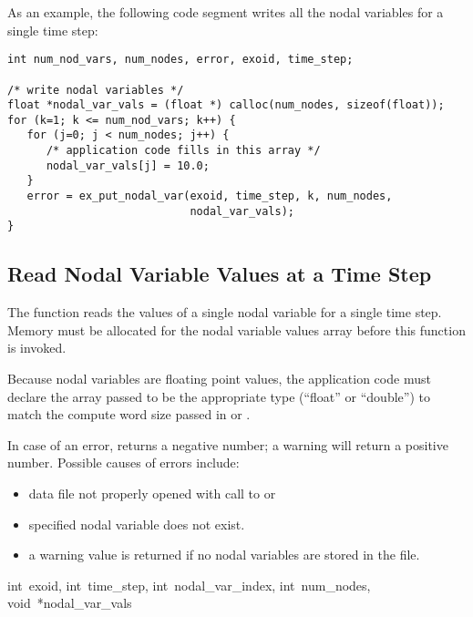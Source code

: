 As an example, the following code segment writes all the nodal
variables for a single time step:

\begin{lstlisting}
int num_nod_vars, num_nodes, error, exoid, time_step;

/* write nodal variables */
float *nodal_var_vals = (float *) calloc(num_nodes, sizeof(float));
for (k=1; k <= num_nod_vars; k++) {
   for (j=0; j < num_nodes; j++) {
      /* application code fills in this array */
      nodal_var_vals[j] = 10.0;
   }
   error = ex_put_nodal_var(exoid, time_step, k, num_nodes,
                            nodal_var_vals);
}
\end{lstlisting}

\subsection{Read Nodal Variable Values at a Time Step}

The function  reads the values of a single
nodal variable for a single time step. Memory must be allocated for
the nodal variable values array before this function is invoked.


Because nodal variables are floating point values, the application
code must declare the array passed to be the appropriate type
(``float'' or ``double'') to match the compute word size passed in
 or .

In case of an error,  returns a negative
number; a warning will return a positive number. Possible causes of
errors include:
\begin{itemize}
 \item data file not properly opened with call to 
 or 

 \item specified nodal variable does not exist.

 \item a warning value is returned if no nodal variables are stored in
 the file.
\end{itemize}

{int~exoid, 
int~time_step, 
int~nodal_var_index,
int~num_nodes, 
void~*nodal_var_vals}

